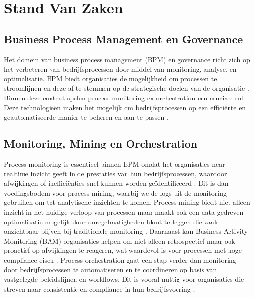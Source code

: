 
\section{Stand Van Zaken}%
\label{sec:stand_van_zaken}
\subsection{Business Process Management en Governance}

Het domein van business process management (BPM) en governance richt zich op het verbeteren van bedrijfsprocessen door middel van monitoring, analyse, en optimalisatie. BPM biedt organisaties de mogelijkheid om processen te stroomlijnen en deze af te stemmen op de strategische doelen van de organisatie \autocite{Dumas2018}. Binnen deze context spelen process monitoring en orchestration een cruciale rol. Deze technologieën maken het mogelijk om bedrijfsprocessen op een efficiënte en geautomatiseerde manier te beheren en aan te passen \autocite{Weske2019}.

\subsection{Monitoring, Mining en Orchestration}

Process monitoring is essentieel binnen BPM omdat het organisaties near-realtime inzicht geeft in de prestaties van hun bedrijfsprocessen, waardoor afwijkingen of inefficiënties snel kunnen worden geïdentificeerd \autocite{Janiesch2012}. Dit is dan voedingsbodem voor process mining, waarbij we de logs uit de monitoring gebruiken om tot analytische inzichten te komen. Process mining biedt niet alleen inzicht in het huidige verloop van processen maar maakt ook een data-gedreven optimalisatie mogelijk door onregelmatigheden bloot te leggen die vaak onzichtbaar blijven bij traditionele monitoring \autocite{Aalst2016}. Daarnaast kan Business Activity Monitoring (BAM) organisaties helpen om niet alleen retrospectief maar ook proactief op afwijkingen te reageren, wat waardevol is voor processen met hoge compliance-eisen \autocite{Janiesch2012}. Process orchestration gaat een stap verder dan monitoring door bedrijfsprocessen te automatiseren en te coördineren op basis van vastgelegde beleidslijnen en workflows. Dit is vooral nuttig voor organisaties die streven naar consistentie en compliance in hun bedrijfsvoering \autocite{Weske2019}. 


